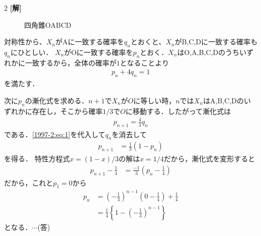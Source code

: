 \documentclass[../../main.tex]{subfiles}
\begin{document}
\setcounter{equation}{0}
\setcounter{figure}{0}
\setcounter{table}{0}
\begin{oframed}
  
\end{oframed}
\setlength{\columnseprule}{0.4pt}
\begin{multicols}{2}
  {\bf[解]}

  \begin{figure}[H]
    \centering
    \caption{四角錐OABCD}
  \end{figure}

  対称性から、$X_n$がAに一致する確率を$q_n$とおくと、$X_n$がB,C,Dに一致する確率も$q_n$にひとしい．
  $X_n$がOに一致する確率を$p_n$とおく．$X_n$はO,A,B,C,Dのうちいずれかに一致するから，全体の確率が$1$となることより
  \begin{align}
    p_n + 4q_n = 1 \label{1997-2:eq:1}
  \end{align}
  を満たす．

  次に$p_n$の漸化式を求める．$n+1$で$X_n$が$O$に等しい時，$n$では$X_n$はA,B,C,Dのいずれかに存在し，そこから確率$1/3$で$O$に移動する．したがって漸化式は
  \begin{align*}
    p_{n+1} = \frac{4}{3}q_n
  \end{align*}
  である．\cref{1997-2:eq:1}を代入して$q_n$を消去して
  \begin{align}
    p_{n+1} & = \frac{1}{3}(1-p_n)
  \end{align}
  を得る．
  特性方程式$x = (1-x)/3$の解は$x = 1/4$だから，漸化式を変形すると
  \begin{align*}
    p_{n+1}-\frac{1}{4} & = \frac{-1}{3}\left(p_n-\frac{1}{4}\right)
  \end{align*}
  だから，これと$p_1=0$から
  \begin{align}
    p_n
     & = \left(-\frac{1}{3}\right)^{n-1}\left(0-\frac{1}{4}\right)+\frac{1}{4} \\
     & = \frac{1}{4}\left\{1-\left(-\frac{1}{3}\right)^{n-1}\right\}
  \end{align}
  となる．$\cdots$(答)


\end{multicols}
\end{document}
